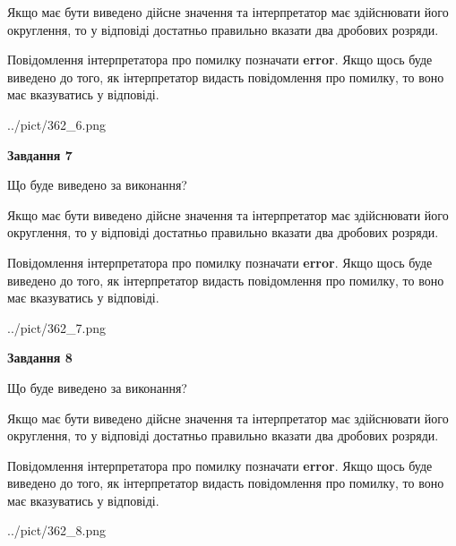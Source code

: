 \documentclass[12pt, ukrainian]{article}
\begin{document}
{\begin {Large}
Якщо має бути виведено дійсне значення та інтерпретатор має здійснювати його округлення, 
то у відповіді достатньо правильно вказати два дробових розряди.

Повідомлення інтерпретатора про помилку позначати \textbf{error}.
Якщо щось буде виведено до того, як інтерпретатор видасть повідомлення про помилку, 
то воно має вказуватись у відповіді. \par

\begin{center}
	{../pict/362_6.png}
\end{center}
\newpage

{\begin {center}\textbf{Завдання 7}\end {center}}\par
Що буде виведено за виконання? \par

Якщо має бути виведено дійсне значення та інтерпретатор має здійснювати його округлення, 
то у відповіді достатньо правильно вказати два дробових розряди.

Повідомлення інтерпретатора про помилку позначати \textbf{error}.
Якщо щось буде виведено до того, як інтерпретатор видасть повідомлення про помилку, 
то воно має вказуватись у відповіді. \par

\begin{center}
	{../pict/362_7.png}
\end{center}
\newpage

{\begin {center}\textbf{Завдання 8}\end {center}}\par
Що буде виведено за виконання? \par

Якщо має бути виведено дійсне значення та інтерпретатор має здійснювати його округлення, 
то у відповіді достатньо правильно вказати два дробових розряди.

Повідомлення інтерпретатора про помилку позначати \textbf{error}.
Якщо щось буде виведено до того, як інтерпретатор видасть повідомлення про помилку, 
то воно має вказуватись у відповіді. \par

\begin{center}
	{../pict/362_8.png}
\end{center}
\newpage


\end{Large}}
\end{document}
